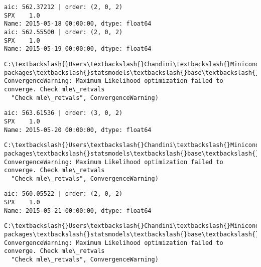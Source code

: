 \documentclass[11pt]{article}
\begin{document}
    \begin{Verbatim}[commandchars=\\\{\}]
aic: 562.37212 | order: (2, 0, 2)
SPX    1.0
Name: 2015-05-18 00:00:00, dtype: float64
aic: 562.55500 | order: (2, 0, 2)
SPX    1.0
Name: 2015-05-19 00:00:00, dtype: float64

    \end{Verbatim}

    \begin{Verbatim}[commandchars=\\\{\}]
C:\textbackslash{}Users\textbackslash{}Chandini\textbackslash{}Miniconda3\textbackslash{}envs\textbackslash{}auquan\textbackslash{}lib\textbackslash{}site-packages\textbackslash{}statsmodels\textbackslash{}base\textbackslash{}model.py:496: ConvergenceWarning: Maximum Likelihood optimization failed to converge. Check mle\_retvals
  "Check mle\_retvals", ConvergenceWarning)

    \end{Verbatim}

    \begin{Verbatim}[commandchars=\\\{\}]
aic: 563.61536 | order: (3, 0, 2)
SPX    1.0
Name: 2015-05-20 00:00:00, dtype: float64

    \end{Verbatim}

    \begin{Verbatim}[commandchars=\\\{\}]
C:\textbackslash{}Users\textbackslash{}Chandini\textbackslash{}Miniconda3\textbackslash{}envs\textbackslash{}auquan\textbackslash{}lib\textbackslash{}site-packages\textbackslash{}statsmodels\textbackslash{}base\textbackslash{}model.py:496: ConvergenceWarning: Maximum Likelihood optimization failed to converge. Check mle\_retvals
  "Check mle\_retvals", ConvergenceWarning)

    \end{Verbatim}

    \begin{Verbatim}[commandchars=\\\{\}]
aic: 560.05522 | order: (2, 0, 2)
SPX    1.0
Name: 2015-05-21 00:00:00, dtype: float64

    \end{Verbatim}

    \begin{Verbatim}[commandchars=\\\{\}]
C:\textbackslash{}Users\textbackslash{}Chandini\textbackslash{}Miniconda3\textbackslash{}envs\textbackslash{}auquan\textbackslash{}lib\textbackslash{}site-packages\textbackslash{}statsmodels\textbackslash{}base\textbackslash{}model.py:496: ConvergenceWarning: Maximum Likelihood optimization failed to converge. Check mle\_retvals
  "Check mle\_retvals", ConvergenceWarning)

    \end{Verbatim}
\end{document}
